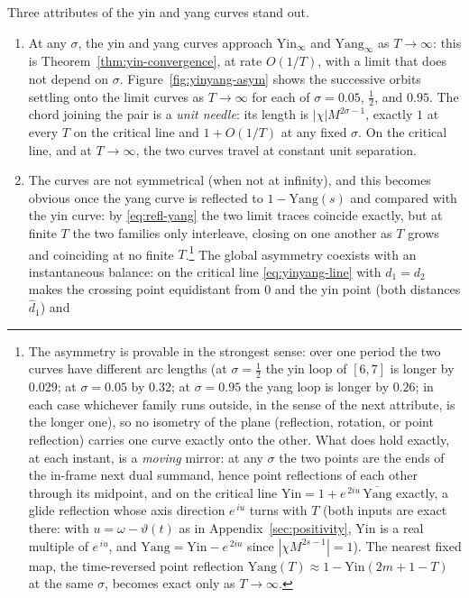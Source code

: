 \documentclass[11pt]{article}
\theoremstyle{definition}
\begin{document}
Three attributes of the yin and yang curves stand out.
\begin{enumerate}
\item At any $\sigma$, the yin and yang curves approach
$\mathrm{Yin}_{\infty}$ and $\mathrm{Yang}_{\infty}$ as $T\to\infty$:
this is Theorem~\ref{thm:yin-convergence}, at rate $O(1/T)$, with a
limit that does not depend on $\sigma$. Figure~\ref{fig:yinyang-asym}
shows the successive orbits settling onto the limit curves as
$T\to\infty$ for each of $\sigma=0.05$, $\tfrac12$, and $0.95$. The chord joining the pair is
a \emph{unit needle}: its length is $|\chi|M^{2\sigma-1}$, exactly $1$
at every $T$ on the critical line and $1+O(1/T)$ at any fixed $\sigma$.
On the critical line, and at $T\to\infty$, the two curves travel at
constant unit separation.
\item The curves are not symmetrical (when not at infinity), and this
becomes obvious once the
yang curve is reflected to $1-\mathrm{Yang}(s)$ and compared with the
yin curve: by \eqref{eq:refl-yang} the two limit traces coincide
exactly, but at finite $T$ the two families only interleave, closing on
one another as $T$ grows and coinciding at no finite
$T$.\footnote{The asymmetry is provable in the strongest sense: over
one period the two curves have different arc lengths (at
$\sigma=\tfrac12$ the yin loop of $[6,7]$ is longer by $0.029$; at
$\sigma=0.05$ by $0.32$; at $\sigma=0.95$ the yang loop is longer by
$0.26$; in each case whichever family runs outside, in the sense of the
next attribute, is the longer one), so no isometry of the
plane (reflection, rotation, or point reflection) carries one curve
exactly onto the other. What does hold exactly, at each instant, is a
\emph{moving} mirror: at any $\sigma$ the two points are the ends of
the in-frame next dual summand, hence point reflections of each other
through its midpoint, and on the critical line
$\mathrm{Yin}=1+e^{\,2iu}\,\overline{\mathrm{Yang}}$ exactly, a glide
reflection whose axis direction $e^{\,iu}$ turns with $T$ (both inputs
are exact there: with $u=\omega-\vartheta(t)$ as in
Appendix~\ref{sec:positivity}, $\mathrm{Yin}$ is a real multiple of
$e^{\,iu}$, and
$\mathrm{Yang}=\mathrm{Yin}-e^{\,2iu}$ since $|\chi M^{2s-1}|=1$). The
nearest fixed map, the time-reversed point reflection
$\mathrm{Yang}(T)\approx1-\mathrm{Yin}(2m{+}1{-}T)$ at the same
$\sigma$, becomes exact only as $T\to\infty$.} The global asymmetry coexists
with an instantaneous balance: on the critical line
\eqref{eq:yinyang-line} with $d_1=d_2$ makes the crossing point
equidistant from $0$ and the yin point (both distances $\hat d_1$) and

\end{enumerate}
\end{document}
